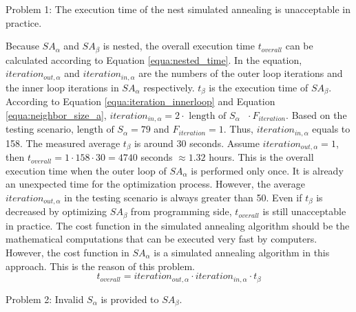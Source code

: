 		Problem 1: The execution time of the nest simulated annealing is unacceptable in
		practice.
		
		Because $SA_{\alpha}$ and $SA_{\beta}$ is nested, the overall execution time
		$t_{overall}$ can be calculated according to Equation \ref{equa:nested_time}.
		In the equation, $iteration_{out,\alpha}$ and $iteration_{in,\alpha}$ are the
		numbers of the outer loop iterations and the inner loop iterations in $SA_{\alpha}$
		respectively.
		$t_{\beta}$ is the execution time of $SA_{\beta}$.
		According to Equation \ref{equa:iteration_innerloop} and Equation
		\ref{equa:neighbor_size_a},
		$iteration_{in,\alpha} = 2 \cdot \text{ length of $S_{\alpha}$ } \cdot F_{iteration}$.
		Based on the testing scenario, $\text{length of $S_{\alpha}$}=79$ and $F_{iteration}=1$.
		Thus, $iteration_{in,\alpha}$ equals to 158.
		The measured average $t_{\beta}$ is around 30 seconds.
		Assume $iteration_{out,\alpha}=1$, then
		$t_{overall}=1 \cdot 158 \cdot 30=4740$ seconds $\approx 1.32$ hours.
		This is the overall execution time when the outer loop of $SA_{\alpha}$ is
		performed only once. It is already an unexpected time for the optimization
		process.
		However, the average $iteration_{out,\alpha}$ in the testing scenario is always
		greater than 50.
		Even if $t_{\beta}$ is decreased by optimizing $SA_{\beta}$ from programming
		side, $t_{overall}$ is still unacceptable in practice.
		The cost function in the simulated annealing algorithm should be the mathematical
		computations that can be executed very fast by computers.
		However, the cost function in $SA_{\alpha}$ is a simulated annealing algorithm
		in this approach. This is the reason of this problem.
		\begin{equation}
		\label{equa:nested_time}
			t_{overall}=iteration_{out,\alpha} \cdot iteration_{in,\alpha} \cdot t_{\beta}
		\end{equation}
		
		Problem 2: Invalid $S_{\alpha}$ is provided to $SA_{\beta}$.
		
